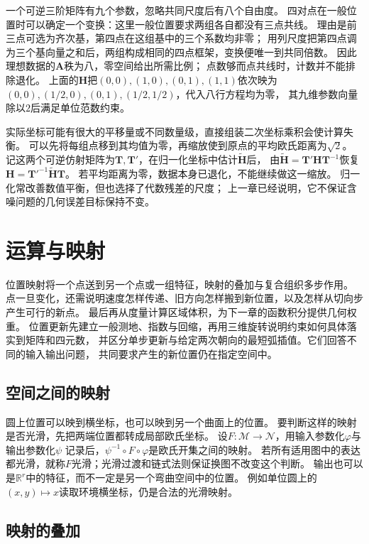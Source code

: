 一个可逆三阶矩阵有九个参数，忽略共同尺度后有八个自由度。
四对点在一般位置时可以确定一个变换：这里一般位置要求两组各自都没有三点共线。
理由是前三点可选为齐次基，第四点在这组基中的三个系数均非零；
用列尺度把第四点调为三个基向量之和后，两组构成相同的四点框架，变换便唯一到共同倍数。
因此理想数据的$\bm A$秩为八，零空间给出所需比例；
点数够而点共线时，计数并不能排除退化。
上面的$\bm H$把$(0,0),(1,0),(0,1),(1,1)$依次映为
$(0,0),(1/2,0),(0,1),(1/2,1/2)$，代入八行方程均为零，
其九维参数向量除以$2$后满足单位范数约束。

实际坐标可能有很大的平移量或不同数量级，直接组装二次坐标乘积会使计算失衡。
可以先将每组点移到其均值为零，再缩放使到原点的平均欧氏距离为$\sqrt2$。
记这两个可逆仿射矩阵为$\bm T,\bm T'$，在归一化坐标中估计$\widetilde{\bm H}$后，
由$\widetilde{\bm H}=\bm T'\bm H\bm T^{-1}$恢复
$\bm H=\bm T'^{-1}\widetilde{\bm H}\bm T$。
若平均距离为零，数据本身已退化，不能继续做这一缩放。
归一化常改善数值平衡，但也选择了代数残差的尺度；
上一章已经说明，它不保证含噪问题的几何误差目标保持不变。

\section{运算与映射}
\label{sec:geometry-operations}

位置映射将一个点送到另一个点或一组特征，映射的叠加与复合组织多步作用。
点一旦变化，还需说明速度怎样传递、旧方向怎样搬到新位置，以及怎样从切向步产生可行的新点。
最后再从度量计算区域体积，为下一章的函数积分提供几何权重。
位置更新先建立一般测地、指数与回缩，再用三维旋转说明约束如何具体落实到矩阵和四元数，
并区分单步更新与给定两次朝向的最短弧插值。它们回答不同的输入输出问题，
共同要求产生的新位置仍在指定空间中。

\subsection{空间之间的映射}
\label{sec:geometry-point-maps}

圆上位置可以映到横坐标，也可以映到另一个曲面上的位置。
要判断这样的映射是否光滑，先把两端位置都转成局部欧氏坐标。
设$F:\mathcal M\to\mathcal N$，用输入参数化$\varphi$与输出参数化$\psi$
记录后，$\psi^{-1}\circ F\circ\varphi$是欧氏开集之间的映射。
若所有适用图中的表达都光滑，就称$F$光滑；光滑过渡和链式法则保证换图不改变这个判断。
输出也可以是$\mathbb R^r$中的特征，而不一定是另一个弯曲空间中的位置。
例如单位圆上的$(x,y)\mapsto x$读取环境横坐标，仍是合法的光滑映射。

\subsection{映射的叠加}
\label{sec:geometry-map-addition}

